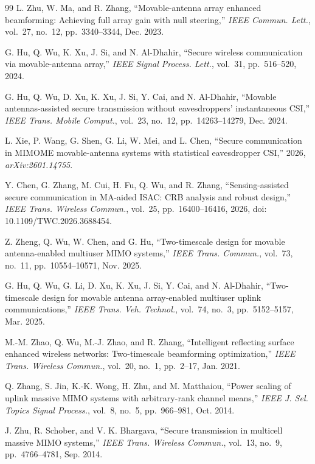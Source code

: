 \documentclass[journal]{IEEEtran}
\begin{document}
\begin{thebibliography}{99}
L. Zhu, W. Ma, and R. Zhang, ``Movable-antenna array enhanced beamforming: Achieving full array gain with null steering,'' \emph{IEEE Commun. Lett.}, vol.~27, no.~12, pp.~3340--3344, Dec. 2023.

G. Hu, Q. Wu, K. Xu, J. Si, and N. Al-Dhahir, ``Secure wireless communication via movable-antenna array,'' \emph{IEEE Signal Process. Lett.}, vol.~31, pp.~516--520, 2024.

G. Hu, Q. Wu, D. Xu, K. Xu, J. Si, Y. Cai, and N. Al-Dhahir, ``Movable antennas-assisted secure transmission without eavesdroppers' instantaneous CSI,'' \emph{IEEE Trans. Mobile Comput.}, vol.~23, no.~12, pp.~14263--14279, Dec. 2024.

L. Xie, P. Wang, G. Shen, G. Li, W. Mei, and L. Chen, ``Secure communication in MIMOME movable-antenna systems with statistical eavesdropper CSI,'' 2026, \emph{arXiv:2601.14755}.

Y. Chen, G. Zhang, M. Cui, H. Fu, Q. Wu, and R. Zhang, ``Sensing-assisted secure communication in MA-aided ISAC: CRB analysis and robust design,'' \emph{IEEE Trans. Wireless Commun.}, vol.~25, pp.~16400--16416, 2026, doi: 10.1109/TWC.2026.3688454.

Z. Zheng, Q. Wu, W. Chen, and G. Hu, ``Two-timescale design for movable antenna-enabled multiuser MIMO systems,'' \emph{IEEE Trans. Commun.}, vol.~73, no.~11, pp.~10554--10571, Nov. 2025.

G. Hu, Q. Wu, G. Li, D. Xu, K. Xu, J. Si, Y. Cai, and N. Al-Dhahir, ``Two-timescale design for movable antenna array-enabled multiuser uplink communications,'' \emph{IEEE Trans. Veh. Technol.}, vol.~74, no.~3, pp.~5152--5157, Mar. 2025.

M.-M. Zhao, Q. Wu, M.-J. Zhao, and R. Zhang, ``Intelligent reflecting surface enhanced wireless networks: Two-timescale beamforming optimization,'' \emph{IEEE Trans. Wireless Commun.}, vol.~20, no.~1, pp.~2--17, Jan. 2021.

Q. Zhang, S. Jin, K.-K. Wong, H. Zhu, and M. Matthaiou, ``Power scaling of uplink massive MIMO systems with arbitrary-rank channel means,'' \emph{IEEE J. Sel. Topics Signal Process.}, vol.~8, no.~5, pp.~966--981, Oct. 2014.

J. Zhu, R. Schober, and V. K. Bhargava, ``Secure transmission in multicell massive MIMO systems,'' \emph{IEEE Trans. Wireless Commun.}, vol.~13, no.~9, pp.~4766--4781, Sep. 2014.


\end{thebibliography}
\end{document}
